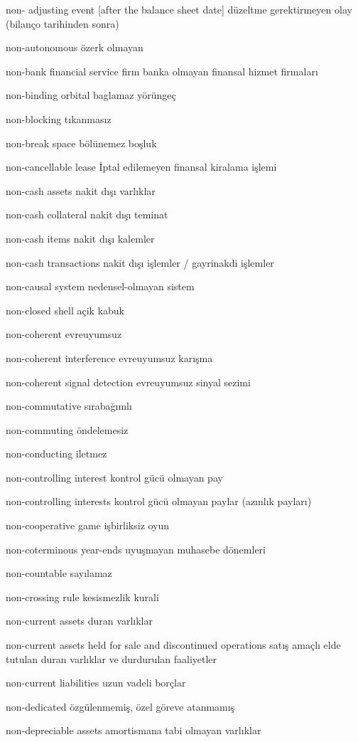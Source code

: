 \documentclass[12pt,fleqn]{article}\usepackage{../../common}
\begin{document}
non- adjusting event [after the balance sheet date] düzeltme gerektirmeyen olay (bilanço tarihinden sonra)

non-autonomous özerk olmayan

non-bank financial service firm banka olmayan finansal hizmet firmaları

non-binding orbital baglamaz yörüngeç

non-blocking tıkanmasız

non-break space bölünemez boşluk

non-cancellable lease İptal edilemeyen finansal kiralama işlemi

non-cash assets nakit dışı varlıklar

non-cash collateral nakit dışı teminat

non-cash items nakit dışı kalemler

non-cash transactions nakit dışı işlemler / gayrinakdi işlemler

non-causal system nedensel-olmayan sistem

non-closed shell açik kabuk

non-coherent evreuyumsuz

non-coherent interference evreuyumsuz karışma

non-coherent signal detection evreuyumsuz sinyal sezimi

non-commutative sırabağımlı

non-commuting öndelemesiz

non-conducting iletmez

non-controlling interest kontrol gücü olmayan pay

non-controlling interests kontrol gücü olmayan paylar (azınlık payları)

non-cooperative game işbirliksiz oyun

non-coterminous year-ends uyuşmayan muhasebe dönemleri

non-countable sayılamaz

non-crossing rule kesismezlik kurali

non-current assets duran varlıklar

non-current assets held for sale and discontinued operations satış amaçlı elde tutulan duran varlıklar ve durdurulan faaliyetler

non-current liabilities uzun vadeli borçlar

non-dedicated özgülenmemiş, özel göreve atanmamış

non-depreciable assets amortismana tabi olmayan varlıklar
\end{document}
